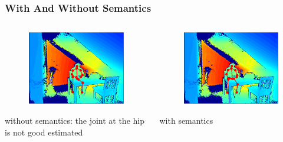 \documentclass[xcolor=dvipsnames]{beamer}
\begin{document}
\begin{frame}
\frametitle{With And Without Semantics}
	\begin{columns}
		\begin{column}{.5\textwidth}
			\begin{figure}
				\includegraphics[width=\textwidth]{img/res2.png}
			\end{figure}
			\begin{center}
				without semantics: the joint at the hip is not good estimated
			\end{center}
		\end{column}
		\begin{column}{.5\textwidth}
			\begin{figure}
				\includegraphics[width=\textwidth]{img/res1.png}
			\end{figure}
			\begin{center}
				with semantics
			\end{center}
		\end{column}
	\end{columns}
\end{frame}
\end{document}
